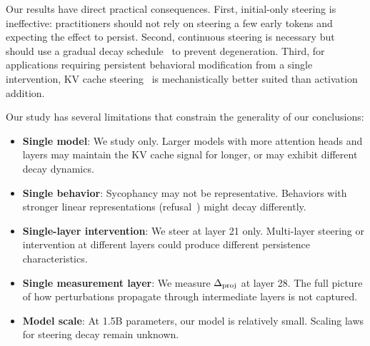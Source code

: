 Our results have direct practical consequences. First, initial-only steering is ineffective: practitioners should not rely on steering a few early tokens and expecting the effect to persist. Second, continuous steering is necessary but should use a gradual decay schedule~\citep{scalena2024dynamic,xie2025comparative} to prevent degeneration. Third, for applications requiring persistent behavioral modification from a single intervention, KV cache steering~\citep{belitsky2025kv} is mechanistically better suited than activation addition.

Our study has several limitations that constrain the generality of our conclusions:

\begin{itemize}[leftmargin=*,itemsep=2pt,topsep=2pt]
\item \textbf{Single model}: We study \qwen only. Larger models with more attention heads and layers may maintain the KV cache signal for longer, or may exhibit different decay dynamics.
\item \textbf{Single behavior}: Sycophancy may not be representative. Behaviors with stronger linear representations (\eg refusal~\citep{arditi2024refusal}) might decay differently.
\item \textbf{Single-layer intervention}: We steer at layer 21 only. Multi-layer steering or intervention at different layers could produce different persistence characteristics.
\item \textbf{Single measurement layer}: We measure $\Delta_{\mathrm{proj}}$ at layer 28. The full picture of how perturbations propagate through intermediate layers is not captured.
\item \textbf{Model scale}: At 1.5B parameters, our model is relatively small. Scaling laws for steering decay remain unknown.
\end{itemize}
